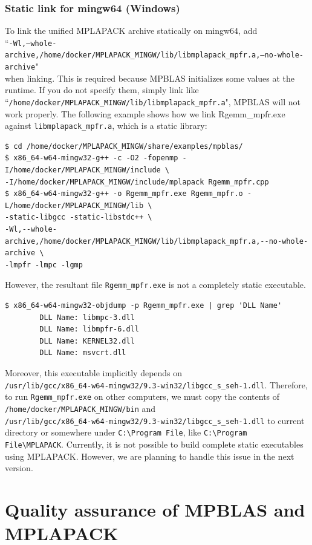 \documentclass[12pt]{article}
\begin{document}
\subsubsection{Static link for mingw64 (Windows)}
To link the unified MPLAPACK archive statically on mingw64, add\\
``{\tt -Wl,--whole-archive,/home/docker/MPLAPACK\_MINGW/lib/libmplapack\_mpfr.a,--no-whole-archive}"\\
when linking. This is required because MPBLAS initializes some values at the runtime. If you do not specify
them, simply link like ``{\tt /home/docker/MPLAPACK\_MINGW/lib/libmplapack\_mpfr.a}", MPBLAS will not work properly.
The following example shows how we link Rgemm\_mpfr.exe against {\tt libmplapack\_mpfr.a}, which is a static library:
\begin{verbatim}
$ cd /home/docker/MPLAPACK_MINGW/share/examples/mpblas/
$ x86_64-w64-mingw32-g++ -c -O2 -fopenmp -I/home/docker/MPLAPACK_MINGW/include \
-I/home/docker/MPLAPACK_MINGW/include/mplapack Rgemm_mpfr.cpp
$ x86_64-w64-mingw32-g++ -o Rgemm_mpfr.exe Rgemm_mpfr.o -L/home/docker/MPLAPACK_MINGW/lib \
-static-libgcc -static-libstdc++ \
-Wl,--whole-archive,/home/docker/MPLAPACK_MINGW/lib/libmplapack_mpfr.a,--no-whole-archive \
-lmpfr -lmpc -lgmp
\end{verbatim}
However, the resultant file {\tt Rgemm\_mpfr.exe} is not a completely static executable.
\begin{verbatim}
$ x86_64-w64-mingw32-objdump -p Rgemm_mpfr.exe | grep 'DLL Name'
        DLL Name: libmpc-3.dll
        DLL Name: libmpfr-6.dll
        DLL Name: KERNEL32.dll
        DLL Name: msvcrt.dll
\end{verbatim}
Moreover, this executable implicitly depends on \\
{\tt /usr/lib/gcc/x86\_64-w64-mingw32/9.3-win32/libgcc\_s\_seh-1.dll}.
Therefore, to run {\tt Rgemm\_mpfr.exe} on other computers, we must copy the contents of {\tt /home/docker/MPLAPACK\_MINGW/bin} and \\
 {\tt /usr/lib/gcc/x86\_64-w64-mingw32/9.3-win32/libgcc\_s\_seh-1.dll}
to current directory or somewhere under {\tt C:\textbackslash{}Program File}, like {\tt C:\textbackslash{}Program File\textbackslash{}MPLAPACK}.
Currently, it is not possible to build complete static executables using MPLAPACK. However, we are planning to handle this issue in the next version.

\section{Quality assurance of MPBLAS and MPLAPACK}
\label{sec:howtotest}
\end{document}
